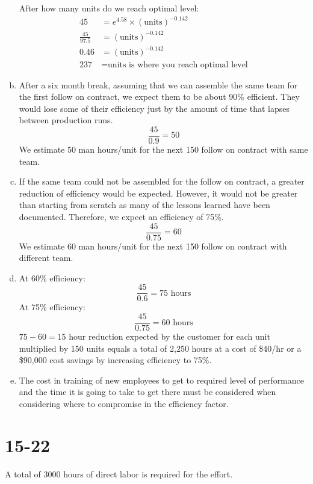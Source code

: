 \documentclass[letterpaper,10pt]{article}
\begin{document}
\begin{enumerate}[a.]
After how many units do we reach optimal level:
\begin{align*}
45 &= e^{4.58}\times(\mbox{units})^{-0.142} \\
\frac{45}{97.5} &= (\mbox{units})^{-0.142} \\
0.46 &= (\mbox{units})^{-0.142} \\
237 &= \mbox{units is where you reach optimal level}
\end{align*}
\item After a six month break, assuming that we can assemble the same team for the first follow on contract, we expect them to be about 90\% efficient.  They would lose some of their efficiency just by the amount of time that lapses between production runs. \[ \frac{45}{0.9} = 50 \] We estimate 50 man hours/unit for the next 150 follow on contract with same team.
\item If the same team could not be assembled for the follow on contract, a greater reduction of efficiency would be expected.  However, it would not be greater than starting from scratch as many of the lessons learned have been documented.  Therefore, we expect an efficiency of 75\%. \[ \frac{45}{0.75} = 60 \] We estimate 60 man hours/unit for the next 150 follow on contract with different team.
\item At 60\% efficiency: \[ \frac{45}{0.6} = 75\mbox{\ hours} \] At 75\% efficiency:\[ \frac{45}{0.75} = 60\mbox{\ hours} \] $75 - 60 = 15$ hour reduction expected by the customer for each unit multiplied by 150 units equals a total of 2,250 hours at a cost of \$40/hr or a \$90,000 cost savings by increasing efficiency to 75\%.
\item The cost in training of new employees to get to required level of performance and the time it is going to take to get there must be considered when considering where to compromise in the efficiency factor.
\end{enumerate}

\section*{15-22}
A total of 3000 hours of direct labor is required for the effort.
\end{document}

